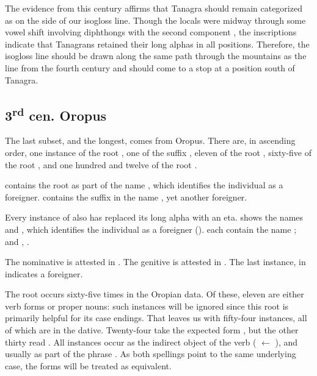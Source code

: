 The evidence from this century affirms that Tanagra should remain categorized as on the  side of our isogloss line.
Though the locals were midway through some vowel shift involving diphthongs with the second component ,
the inscriptions indicate that Tanagrans retained their long alphas in all positions.
Therefore,
the isogloss line should be drawn along the same path through the mountains as the line from the fourth century 
and should come to a stop at a position south of Tanagra.

\subsection{3\textsuperscript{rd} cen.  Oropus}
The last subset, and the longest, comes from Oropus. 
There are,
in ascending order, 
one instance of the root ,
one of the suffix ,
eleven of the root ,
sixty-five of the root ,
and one hundred and twelve of the root .

 contains the root  as part of the name ,
which identifies the individual as a foreigner.
 contains the suffix  in the name ,
yet another foreigner.

Every instance of  also has replaced its long alpha with an eta.
 shows the names  and ,
which identifies the individual as a foreigner
().
 each contain the name ;
and , 
.

The nominative  is attested in .
The genitive  is attested in .
The last instance,
 in  indicates a foreigner.

The root  occurs sixty-five times in the Oropian data.
Of these,
eleven are either verb forms or proper nouns:
such instances will be ignored since this root is primarily helpful for its case endings.
That leaves us with fifty-four instances,
all of which are in the dative.
Twenty-four take the expected form ,
but the other thirty read .
All instances occur as the indirect object of the verb  ( $\gets$ ),
and usually as part of the phrase .
As both spellings point to the same underlying case,
the forms will be treated as equivalent. 
	
